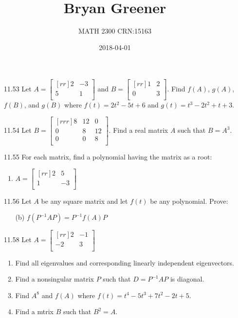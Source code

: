 \documentclass[12pt]{article}
\title{Bryan Greener}
\author{MATH 2300 CRN:15163}
\date{2018-04-01}
\theoremstyle{definition}
\theoremstyle{plain}
\begin{document}
\maketitle

\TabPositions{4cm}

\begin{enumerate}
\item[11.53]Let $A=\begin{bmatrix}[rr]2&-3\\5&1\\\end{bmatrix}$ and $B=\begin{bmatrix}[rr]1&2\\0&3\\\end{bmatrix}$. Find $f(A)$, $g(A)$, $f(B)$, and $g(B)$ where $f(t)=2t^2-5t+6$ and $g(t)=t^3-2t^2+t+3$.

\item[11.54]Let $B=\begin{bmatrix}[rrr]8&12&0\\0&8&12\\0&0&8\\\end{bmatrix}$. Find a real matrix $A$ such that $B=A^3$.

\item[11.55]For each matrix, find a polynomial having the matrix as a root:
	\begin{enumerate}
	\item $A=\begin{bmatrix}[rr]2&5\\1&-3\\\end{bmatrix}$
	\end{enumerate}
	
\item[11.56]Let $A$ be any square matrix and let $f(t)$ be any polynomial. Prove:
	\begin{enumerate}
	\item[(b)] $f(P^{-1}AP)=P^{-1}f(A)P$
	\end{enumerate}
			
\item[11.58]Let $A=\begin{bmatrix}[rr]2&-1\\-2&3\\\end{bmatrix}$
	\begin{enumerate}
	\item Find all eigenvalues and corresponding linearly independent eigenvectors.
	\item Find a nonsingular matrix $P$ such that $D=P^{-1}AP$ is diagonal. 
	\item Find $A^8$ and $f(A)$ where $f(t)=t^4-5t^3+7t^2-2t+5$.
	\item Find a mtrix $B$ such that $B^2=A$.
	\end{enumerate}
	

\end{enumerate}
\end{document}
